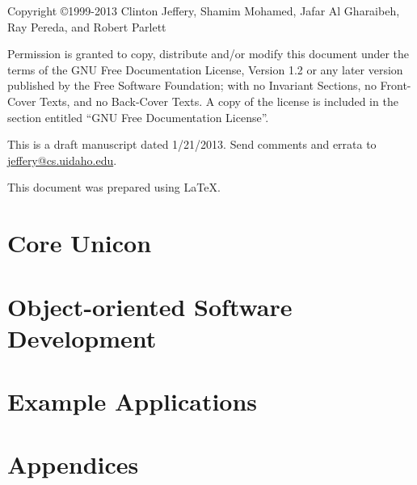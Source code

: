 \documentclass[letterpaper,twoside,12pt]{book}
\begin{document}
\thispagestyle{empty}
\bigskip
\bigskip
Copyright \copyright 1999-2013 Clinton Jeffery, Shamim Mohamed,
Jafar Al Gharaibeh, Ray Pereda, and Robert Parlett

Permission is granted to copy, distribute and/or modify this document under the
terms of the GNU Free Documentation License, Version 1.2 or any later version
published by the Free Software Foundation; with no Invariant Sections, no
Front-Cover Texts, and no Back-Cover Texts. A copy of the license is included in
the section entitled ``GNU Free Documentation License''.
\bigskip

This is a draft manuscript dated 1/21/2013.  Send comments and errata
to \href{mailto:jeffery@cs.uidaho.edu}{jeffery@cs.uidaho.edu}.

\bigskip
This document was prepared using \LaTeX.
\clearpage

\frontmatter
\setcounter{tocdepth}{2}
\tableofcontents


\mainmatter



\part{Core Unicon}











\part{Object-oriented Software Development}







\part{Example Applications}








\part{Appendices}
\appendix






% 

\backmatter


\small
\printindex
\end{document}
